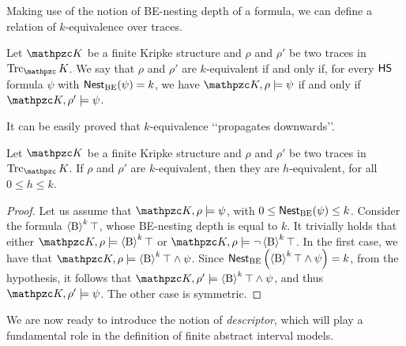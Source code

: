 Making use of the notion of BE-nesting depth of a formula, we can define a relation of $k$-equivalence over traces.
\begin{definition}[$k$-equivalence]\label{def:k-equivalence}
Let $\Ku$ be a finite Kripke structure and $\rho$ and $\rho'$ be two traces in $\Trk_\Ku$. We say that $\rho$ and $\rho'$ are $k$-equivalent if and only if, for every $\text{\sffamily HS}$ formula $\psi$ with $\operatorname{\mathsf{Nest}_{BE}}(\psi)=k$, we have $\Ku,\rho\models \psi$ if and only if $\Ku,\rho'\models \psi$.
\end{definition}
It can be easily proved that $k$-equivalence \lq\lq propagates downwards\rq\rq .
\begin{proposition}
Let $\Ku$ be a finite Kripke structure and $\rho$ and $\rho'$ be two traces in $\Trk_\Ku$. If $\rho$ and $\rho'$ are $k$-equivalent, then they are $h$-equivalent, 
for all $0\leq h\leq k$.
\end{proposition}
 \begin{proof}
 Let us assume that $\Ku,\rho\models \psi$, with $0\leq \operatorname{\mathsf{Nest}_{BE}}(\psi)\leq k$. Consider the formula $\operatorname{\langle B\rangle}^k\top$, whose BE-nesting depth is equal to $k$. It trivially holds that either $\Ku,\rho\models \hsB^k\top$ or $\Ku,\rho\models \neg\hsB^k\top$. In the first case, we have that $\Ku,\rho\models \hsB^k\top \wedge \psi$. Since $\operatorname{\mathsf{Nest}_{BE}}\left(\operatorname{\langle B\rangle}^k\top \wedge \psi\right)=k$, from the hypothesis, it follows that $\Ku,\rho'\models \hsB^k\top \wedge \psi$, and thus $\Ku,\rho'\models \psi$. The other case is symmetric.
 \end{proof}

We are now ready to introduce the notion of \emph{descriptor}, which will play a fundamental role in the definition of finite abstract interval models.

